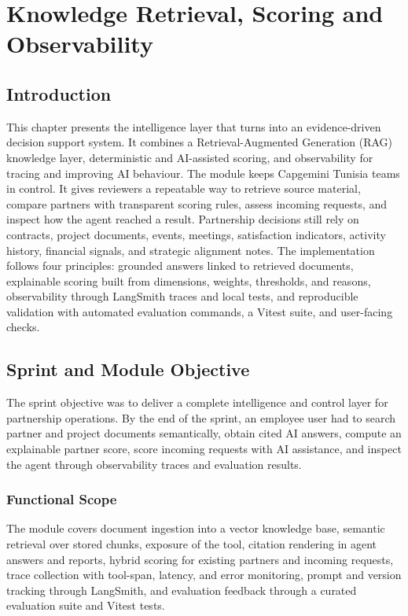 \chapter{Knowledge Retrieval, Scoring and Observability}
\label{chap:rag-scoring-observability}
\section{Introduction}
\label{sec:chapter7-introduction}
This chapter presents the intelligence layer that turns \projectname{} into an evidence-driven decision support system. It combines a Retrieval-Augmented Generation (RAG) knowledge layer, deterministic and AI-assisted scoring, and observability for tracing and improving AI behaviour.
The module keeps Capgemini Tunisia teams in control. It gives reviewers a repeatable way to retrieve source material, compare partners with transparent scoring rules, assess incoming requests, and inspect how the agent reached a result. Partnership decisions still rely on contracts, project documents, events, meetings, satisfaction indicators, activity history, financial signals, and strategic alignment notes.
The implementation follows four principles: grounded answers linked to retrieved documents, explainable scoring built from dimensions, weights, thresholds, and reasons, observability through LangSmith traces and local tests, and reproducible validation with automated evaluation commands, a Vitest suite, and user-facing checks.
\section{Sprint and Module Objective}
\label{sec:chapter7-sprint-objective}
The sprint objective was to deliver a complete intelligence and control layer for partnership operations. By the end of the sprint, an employee user had to search partner and project documents semantically, obtain cited AI answers, compute an explainable partner score, score incoming requests with AI assistance, and inspect the agent through observability traces and evaluation results.
\subsection{Functional Scope}
\label{subsec:chapter7-functional-scope}
The module covers document ingestion into a vector knowledge base, semantic retrieval over stored chunks, exposure of the  tool, citation rendering in agent answers and reports, hybrid scoring for existing partners and incoming requests, trace collection with tool-span, latency, and error monitoring, prompt and version tracking through LangSmith, and evaluation feedback through a curated evaluation suite and Vitest tests.
